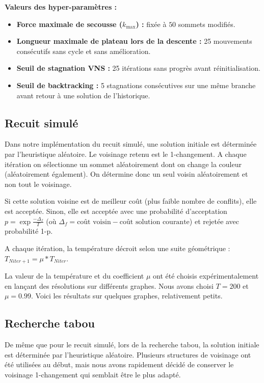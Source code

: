 \documentclass{article}
\begin{document}
\textbf{Valeurs des hyper-paramètres :}\\
\begin{itemize}
    \item \textbf{Force maximale de secousse ($k_{\max}$) : } fixée à $50$ sommets modifiés.
    \item \textbf{Longueur maximale de plateau lors de la descente : } 25 mouvements consécutifs sans cycle et sans amélioration.
    \item \textbf{Seuil de stagnation VNS : } 25 itérations sans progrès avant réinitialisation.
    \item \textbf{Seuil de backtracking : } 5 stagnations consécutives sur une même branche avant retour à une solution de l'historique.
\end{itemize}

\subsection{Recuit simulé}
Dans notre implémentation du recuit simulé, une solution initiale est déterminée par l'heuristique aléatoire. Le voisinage retenu est le 1-changement. A chaque itération on sélectionne un sommet aléatoirement dont on change la couleur (aléatoirement également). On détermine donc un seul voisin aléatoirement et non tout le voisinage.

\noindent Si cette solution voisine est de meilleur coût (plus faible nombre de conflits), elle est acceptée. Sinon, elle est acceptée avec une probabilité d'acceptation $p = \exp{\frac{-\Delta_f}{T}}$ (où $\Delta_f = \text{coût voisin} - \text{coût solution courante}$) et rejetée avec probabilité 1-p.

A chaque itération, la température décroit selon une suite géométrique : $T_{Niter + 1} = \mu*T_{Niter}$.

La valeur de la température et du coefficient $\mu$ ont été choisis expérimentalement en lançant des résolutions sur différents graphes.
Nous avons choisi $T = 200$ et $\mu = 0.99$.
Voici les résultats sur quelques graphes, relativement petits.

\subsection{Recherche tabou}

De même que pour le recuit simulé, lors de la recherche tabou, la solution initiale est déterminée par l'heuristique aléatoire.
Plusieurs structures de voisinage ont été utilisées au début, mais nous avons rapidement décidé de conserver le voisinage 1-changement qui semblait être le plus adapté.
\end{document}
